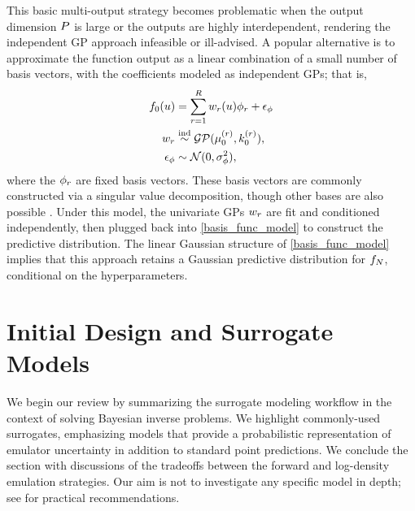 \documentclass[12pt]{article}
\begin{document}
This basic multi-output strategy becomes problematic when the output dimension $\dimObs$ 
is large or the outputs are highly interdependent, rendering the independent GP approach infeasible or ill-advised.
A popular alternative is to approximate the function output as a linear combination of a small number
of basis vectors, with the coefficients modeled as independent GPs; that is, 
\begin{align}
\funcPrior(\Par) &= \sum_{\idxBasis=1}^{\dimBasis} \basisWeight_{\idxBasis}(\Par) \basisVec_{\idxBasis} + \noise_{\basisVec} \label{basis_func_model} \\
\basisWeight_{\idxBasis} &\overset{\textrm{ind}}{\sim} \GP(\emMean[0]{(\idxBasis)}, \emKer[0]{(\idxBasis)}), \label{basis_func_GPs} \\
 \noise_{\basisVec} &\sim \Gaussian(0, \sigma^2_{\basisVec}), \label{basis_func_noise}
\end{align}
where the $\basisVec_{\idxBasis}$ are fixed basis vectors.
These basis vectors are commonly constructed via a singular value decomposition, though other 
bases are also possible \citep{HigdonBasis, emulate_functional_output, functionValuedModels, PODemulation}.
Under this model, the univariate GPs $\basisWeight_{\idxBasis}$ are fit and conditioned independently, then 
plugged back into \cref{basis_func_model} to construct the predictive distribution. The linear Gaussian 
structure of \cref{basis_func_model} implies that this approach retains a Gaussian predictive distribution
for $\funcEm[\Ndesign]$, conditional on the hyperparameters.

\section{Initial Design and Surrogate Models} \label{sec:surrogate-models}
We begin our review by summarizing the surrogate modeling workflow in the context of solving
Bayesian inverse problems. We highlight commonly-used surrogates, emphasizing
models that provide a probabilistic representation of emulator uncertainty in addition to 
standard point predictions. We conclude the section with discussions of the tradeoffs
between the forward and log-density emulation strategies. Our aim is not to investigate any specific 
model in depth; see  for practical recommendations.
\end{document}
